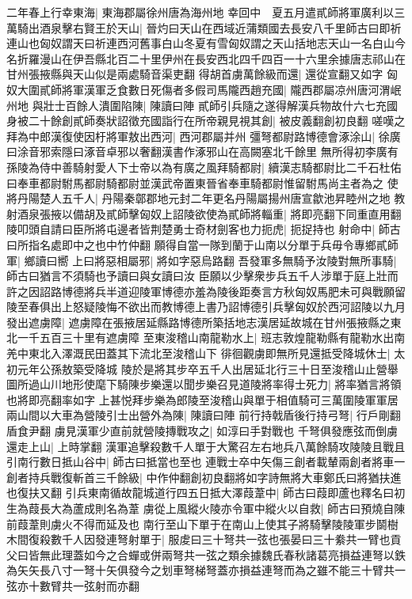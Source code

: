 二年春上行幸東海|{
	東海郡屬徐州唐為海州地}
幸回中　夏五月遣貳師將軍廣利以三萬騎出酒泉擊右賢王於天山|{
	晉灼曰天山在西域近蒲類國去長安八千里師古曰即祈連山也匈奴謂天曰祈連西河舊事白山冬夏有雪匈奴謂之天山括地志天山一名白山今名折羅漫山在伊吾縣北百二十里伊州在長安西北四千四百一十六里余據唐志祁山在甘州張掖縣與天山似是兩處騎音渠吏翻}
得胡首虜萬餘級而還|{
	還從宣翻又如字}
匈奴大圍貳師將軍漢軍乏食數日死傷者多假司馬隴西趙充國|{
	隴西郡屬凉州唐河渭岷州地}
與壯士百餘人潰圍陷陳|{
	陳讀曰陣}
貳師引兵隨之遂得解漢兵物故什六七充國身被二十餘創貳師奏狀詔徵充國詣行在所帝親見視其創|{
	被皮義翻創初良翻}
嗟嘆之拜為中郎漢復使因杅將軍敖出西河|{
	西河郡屬并州}
彊弩都尉路博德會涿涂山|{
	徐廣曰涂音邪索隱曰涿音卓邪以奢翻漢書作涿邪山在高闕塞北千餘里}
無所得初李廣有孫陵為侍中善騎射愛人下士帝以為有廣之風拜騎都尉|{
	續漢志騎都尉比二千石杜佑曰奉車都尉駙馬都尉騎都尉並漢武帝置東晉省奉車騎都尉惟留駙馬尚主者為之}
使將丹陽楚人五千人|{
	丹陽秦鄣郡地元封二年更名丹陽屬揚州唐宣歙池昇睦州之地}
教射酒泉張掖以備胡及貳師擊匈奴上詔陵欲使為貳師將輜重|{
	將即亮翻下同重直用翻}
陵叩頭自請曰臣所將屯邊者皆荆楚勇士奇材劍客也力扼虎|{
	扼捉持也}
射命中|{
	師古曰所指名處即中之也中竹仲翻}
願得自當一隊到蘭于山南以分單于兵毋令專鄉貳師軍|{
	鄉讀曰嚮}
上曰將惡相屬邪|{
	將如字惡烏路翻}
吾發軍多無騎予汝陵對無所事騎|{
	師古曰猶言不須騎也予讀曰與女讀曰汝}
臣願以少擊衆步兵五千人涉單于庭上壯而許之因詔路博德將兵半道迎陵軍博德亦羞為陵後距奏言方秋匈奴馬肥未可與戰願留陵至春俱出上怒疑陵悔不欲出而教博德上書乃詔博德引兵擊匈奴於西河詔陵以九月發出遮虜障|{
	遮虜障在張掖居延縣路博德所築括地志漢居延故城在甘州張掖縣之東北一千五百三十里有遮虜障}
至東浚稽山南龍勒水上|{
	班志敦煌龍勒縣有龍勒水出南羌中東北入澤溉民田蓋其下流北至浚稽山下}
徘徊觀虜即無所見還抵受降城休士|{
	太初元年公孫敖築受降城}
陵於是將其步卒五千人出居延北行三十日至浚稽山止營舉圖所過山川地形使麾下騎陳步樂還以聞步樂召見道陵將率得士死力|{
	將率猶言將領也將即亮翻率如字}
上甚悦拜步樂為郎陵至浚稽山與單于相值騎可三萬圍陵軍軍居兩山間以大車為營陵引士出營外為陳|{
	陳讀曰陣}
前行持戟盾後行持弓弩|{
	行戶剛翻盾食尹翻}
虜見漢軍少直前就營陵摶戰攻之|{
	如淳曰手對戰也}
千弩俱發應弦而倒虜還走上山|{
	上時掌翻}
漢軍追擊殺數千人單于大驚召左右地兵八萬餘騎攻陵陵且戰且引南行數日抵山谷中|{
	師古曰抵當也至也}
連戰士卒中矢傷三創者載輦兩創者將車一創者持兵戰復斬首三千餘級|{
	中作仲翻創初良翻將如字詩無將大車鄭氏曰將猶扶進也復扶又翻}
引兵東南循故龍城道行四五日抵大澤葭葦中|{
	師古曰葭即蘆也釋名曰初生為葭長大為蘆成則名為葦}
虜從上風縱火陵亦令軍中縱火以自救|{
	師古曰預燒自陳前葭葦則虜火不得而延及也}
南行至山下單于在南山上使其子將騎擊陵陵軍步鬬樹木間復殺數千人因發連弩射單于|{
	服䖍曰三十弩共一弦也張晏曰三十絭共一臂也貢父曰皆無此理蓋如今之合蟬或併兩弩共一弦之類余據魏氏春秋諸葛亮損益連弩以鉄為矢矢長八寸一弩十矢俱發今之划車弩梯弩蓋亦損益連弩而為之雖不能三十臂共一弦亦十數臂共一弦射而亦翻}

